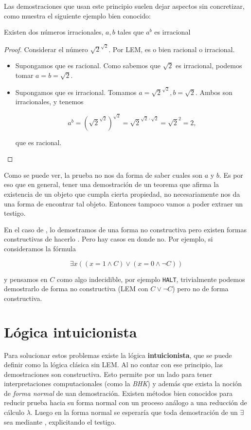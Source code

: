 Las demostraciones que usan este principio suelen dejar aspectos sin
concretizar, como muestra el siguiente ejemplo bien conocido:

\begin{theorem}\label{fri:thm:irrat}
    Existen dos números irracionales, $a, b$ tales que $a^b$ es irracional
\end{theorem}
\begin{proof}
    Considerar el número $\sqrt{2}^{\sqrt{2}}$. Por LEM, es o bien racional o
    irracional.
    \begin{itemize}
        \item Supongamos que es racional. Como sabemos que $\sqrt{2}$ es
        irracional, podemos tomar $a=b=\sqrt{2}$.
        \item Supongamos que es irracional. Tomamos $a = \sqrt{2}^{\sqrt{2}}, b
        = \sqrt{2}$. Ambos son irracionales, y tenemos

        \[
            a^b
            = \left( \sqrt{2}^{\sqrt{2}} \right)^{\sqrt{2}}
            = \sqrt{2}^{\sqrt{2} \cdot \sqrt{2}}
            = \sqrt{2}^{2}
            = 2,
        \]

        que es racional.
    \end{itemize}
\end{proof}

Como se puede ver, la prueba no nos da forma de saber cuales son $a$ y $b$. Es
por eso que en general, tener una demostración de un teorema que afirma la
existencia de un objeto que cumpla cierta propiedad, no necesariamente nos da
una forma de encontrar tal objeto. Entonces tampoco vamos a poder extraer un
testigo.

En el caso de , lo demostramos de una forma no constructiva pero
existen formas constructivas de hacerlo . Pero hay casos en donde
no. Por ejemplo, si consideramos la fórmula

\[
    \exists x ((x = 1 \wedge C) \vee (x = 0 \wedge \neg C))
\]

y pensamos en $C$ como algo indecidible, por ejemplo \texttt{HALT}, trivialmente
podemos demostrarlo de forma no constructiva (LEM con $C \vee \neg C$) pero no
de forma constructiva.

\section{Lógica intuicionista}

Para solucionar estos problemas existe la lógica \textbf{intuicionista}, que se
puede definir como la lógica clásica sin LEM. Al no contar con ese principio,
las demostraciones son constructiva. Esto permite por un lado para tener
interpretaciones computacionales (como la \textit{BHK}) y además que exista la
noción de \textit{forma normal} de uan demostración. Existen métodos bien
conocidos para reducir prueba hacia su
forma normal con un proceso análogo a una reducción de cálculo $\lambda$. Luego
en la forma normal se esperaría que toda demostración de un $\exists$ sea
mediante , explicitando el testigo.

